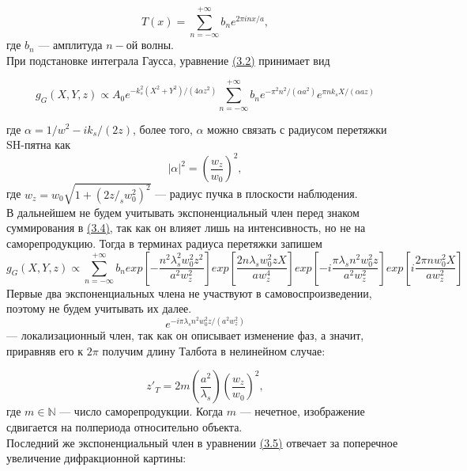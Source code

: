 \begin{equation}
T(x) = \sum_{n=-\infty}^{+\infty} b_n e^{2\pi inx/a},
\end{equation}
где $b_n$ --- амплитуда $n-$ой волны.\\

При подстановке интеграла Гаусса, уравнение \hyperref[3_2]{(3.2)} принимает вид

\begin{equation}
\label{3_4}
g_G(X,Y,z) \propto A_0 e^{-k_s^2(X^2+Y^2)/(4\alpha z^2)} \sum_{n=-\infty}^{+\infty} b_n e^{-\pi^2 n^2/(\alpha a^2)} e^{\pi n k_s X/(\alpha a z)}
\end{equation}

где $\alpha = 1/w^2 - i k_s/(2z)$, более того, $\alpha$ можно связать с радиусом перетяжки SH-пятна как 
\[
|\alpha|^2 = \left(\dfrac{w_z}{w_0}\right)^2,
\]
где $w_z = w_0\sqrt{1 + (2z/_sw_0^2)^2}$ --- радиус пучка в плоскости наблюдения.\\

В дальнейшем не будем учитывать экспоненциальный член перед знаком суммирования в \hyperref[3_4]{(3.4)}, так как он влияет лишь на интенсивность, но не на саморепродукцию. Тогда в терминах радиуса перетяжки запишем
\begin{equation}
\label{3_5}
    g_G(X, Y, z) \propto \sum_{n=-\infty}^{+\infty} b_n exp\left[-\dfrac{n^2\lambda_s^2w_0^2z^2}{a^2w_z^2}\right] exp\left[\dfrac{2n\lambda_sw_0^2zX}{aw_z^4}\right] exp\left[-i\dfrac{\pi\lambda_sn^2w_0^2z}{a^2w_z^2}\right] exp\left[i\dfrac{2\pi n w_0^2X}{aw_z^2}\right]
\end{equation}
Первые два экспоненциальных члена не участвуют в самовоспроизведении, поэтому не будем учитывать их далее.\\

\begin{equation}
e^{-i\pi \lambda_s n^2 w_0^2 z/(a^2 w_z^2)}
\end{equation}
--- локализационный член, так как он описывает изменение фаз, а значит, приравняв его к $2\pi$ получим длину Талбота в нелинейном случае:

\begin{equation}
z'_T = 2m \left(\frac{a^2}{\lambda_s}\right) \left(\frac{w_z}{w_0}\right)^2,
\end{equation}
где $m\in \mathbb{N}$ --- число саморепродукции. Когда $m$ --- нечетное, изображение сдвигается на полпериода относительно объекта.\\

Последний же экспоненциальный член в уравнении \hyperref[3_5]{(3.5)} отвечает за поперечное увеличение дифракционной картины:


